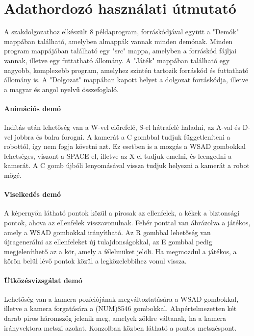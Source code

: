 \chapter*{Adathordozó használati útmutató}

A szakdolgozathoz elkészült 8 példaprogram, forráskódjával együtt a "Demók" mappában található, amelyben almappák vannak minden demónak. Minden program mappájában található egy "src" mappa, amelyben a forráskód fájljai vannak, illetve egy futtatható állomány. A "Játék" mappában található egy nagyobb, komplexebb program, amelyhez szintén tartozik forráskód és futtatható állomány is. A "Dolgozat" mappában kapott helyet a dolgozat forráskódja, illetve a magyar és angol nyelvű összefoglaló.

\subsubsection{Animációs demó}

Indítás után lehetőség van a W-vel előrefelé, S-el hátrafelé haladni, az A-val és D-vel jobbra és balra forogni. A kamerát a C gombbal tudjuk függetleníteni a robottól, így nem fogja követni azt. Ez esetben is a mozgás a WSAD gombokkal lehetséges, viszont a SPACE-el, illetve az X-el tudjuk emelni, és leengedni a kamerát. A C gomb újbóli lenyomásával vissza tudjuk helyezni a kamerát a robot mögé.

\subsubsection{Viselkedés demó}

A képernyőn látható pontok közül a pirosak az ellenfelek, a kékek a biztonsági pontok, ahova az ellenfelek visszavonulnak. Fehér ponttal van ábrázolva a játékos, amely a WSAD gombokkal irányítható. Az R gombbal lehetőség van újragenerálni az ellenfeleket új tulajdonságokkal, az E gombbal pedig megjeleníthető az a kör, amely a félelmüket jelöli. Ha megmozdul a játékos, a körön belül lévő pontok közül a legközelebbihez vonul vissza.

\subsubsection{Ütközésvizsgálat demó}

Lehetőség van a kamera pozíciójának megváltoztatására a WSAD gombokkal, illetve a kamera forgatására a (NUM)8546 gombokkal. Alapértelmezetten két darab piros háromszög jelenik meg, amelyek zöldre váltanak, ha a kamera irányvektora metszi azokat. Konzolban közben látható a pontos metszéspont.

